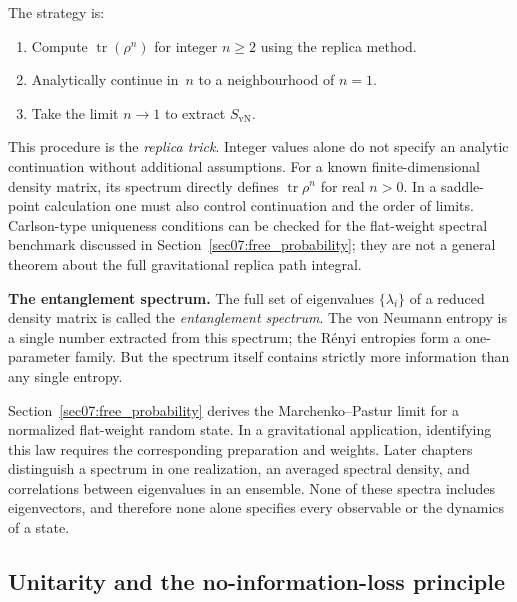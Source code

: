 \documentclass[11pt,letterpaper]{article}
\theoremstyle{plain}
\theoremstyle{definition}
\theoremstyle{remark}
\DeclareMathOperator{\tr}{tr}
\begin{document}
The strategy is:
\begin{enumerate}[label=\arabic*.,itemsep=1pt]
\item Compute $\tr(\rho^n)$ for integer $n\geq 2$ using the replica method.
\item Analytically continue in~$n$ to a neighbourhood of $n=1$.
\item Take the limit $n\to 1$ to extract $S_{\mathrm{vN}}$.
\end{enumerate}
This procedure is the \emph{replica trick}. Integer values alone do not
specify an analytic continuation without additional assumptions. For a known
finite-dimensional density matrix, its spectrum directly defines
$\tr\rho^n$ for real $n>0$. In a saddle-point calculation one must also
control continuation and the order of limits. Carlson-type uniqueness
conditions can be checked for the flat-weight spectral benchmark discussed
in Section~\ref{sec07:free_probability}; they are not a general theorem
about the full gravitational replica path integral.

\medskip
\noindent\textbf{The entanglement spectrum.}
The full set of eigenvalues $\{\lambda_i\}$ of a reduced density matrix is called
the \emph{entanglement spectrum}.  The von Neumann entropy is a single number extracted
from this spectrum; the R\'{e}nyi entropies form a one-parameter family.  But the
spectrum itself contains strictly more information than any single entropy.

Section~\ref{sec07:free_probability} derives the Marchenko--Pastur
limit for a normalized flat-weight random state. In a gravitational
application, identifying this law requires the corresponding preparation
and weights. Later chapters distinguish a spectrum in one realization,
an averaged spectral density, and correlations between eigenvalues in
an ensemble. None of these spectra includes eigenvectors, and therefore
none alone specifies every observable or the dynamics of a state.

\subsection{Unitarity and the no-information-loss principle}
\label{subsec02:unitarity}
\end{document}

